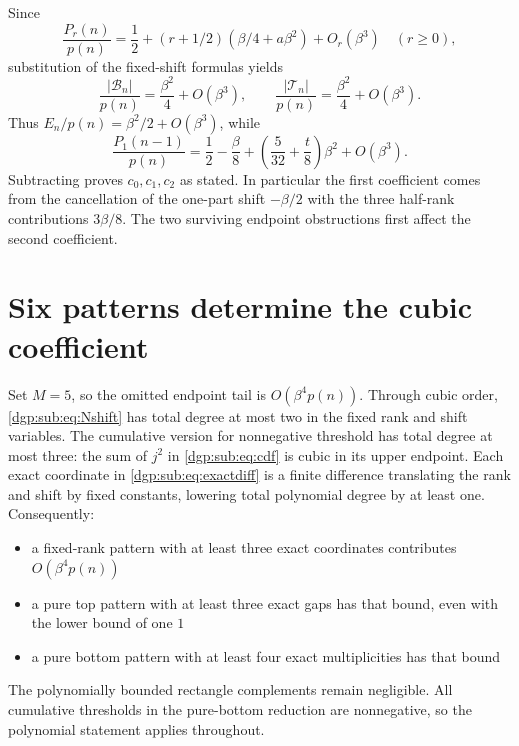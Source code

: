 \documentclass[11pt,letterpaper]{article}
\numberwithin{equation}{section}
\theoremstyle{remark}\newtheorem{remark}[theorem]{Remark}
\begin{document}
Since
\[
 \frac{P_r(n)}{p(n)}=\frac12+(r+1/2)(\beta/4+a\beta^2)
                       +O_r(\beta^3)\quad(r\geq0),
\]
substitution of the fixed-shift formulas yields
\[
 \frac{|\mathcal B_n|}{p(n)}=\frac{\beta^2}4+O(\beta^3),
 \qquad
 \frac{|\mathcal T_n|}{p(n)}=\frac{\beta^2}4+O(\beta^3).
\]
Thus $E_n/p(n)=\beta^2/2+O(\beta^3)$, while
\begin{equation}\label{dgp:sub:eq:Psource2}
 \frac{P_1(n-1)}{p(n)}=\frac12-\frac\beta8
                       +\left(\frac5{32}+\frac t8\right)\beta^2
                       +O(\beta^3).
\end{equation}
Subtracting proves $c_0,c_1,c_2$ as stated. In particular the first
coefficient comes from the cancellation of the one-part shift
$-\beta/2$ with the three half-rank contributions $3\beta/8$.
The two surviving endpoint obstructions first affect the second
coefficient.

\section{Six patterns determine the cubic coefficient}\label{dgp:sub:sec:cubic}
Set $M=5$, so the omitted endpoint tail is $O(\beta^4p(n))$.
Through cubic order, \eqref{dgp:sub:eq:Nshift} has total degree at most two
in the fixed rank and shift variables. The cumulative version for
nonnegative threshold has total degree at most three: the sum of
$j^2$ in \eqref{dgp:sub:eq:cdf} is cubic in its upper endpoint.
Each exact coordinate in \eqref{dgp:sub:eq:exactdiff} is a finite difference
translating the rank and shift by fixed constants, lowering total
polynomial degree by at least one. Consequently:
\begin{itemize}
\item a fixed-rank pattern with at least three exact coordinates
      contributes $O(\beta^4p(n))$
\item a pure top pattern with at least three exact gaps has that
      bound, even with the lower bound of one $1$
\item a pure bottom pattern with at least four exact multiplicities
      has that bound
\end{itemize}
The polynomially bounded rectangle complements remain negligible.
All cumulative thresholds in the pure-bottom reduction are
nonnegative, so the polynomial statement applies throughout.
\end{document}
